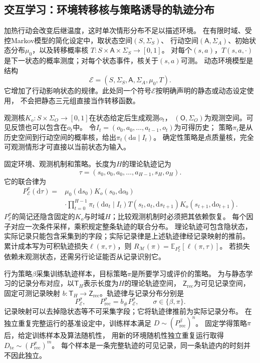 \subsection{交互学习：环境转移核与策略诱导的轨迹分布}
\label{sec:future-interactive-learning-process}

加热行动会改变后继温度，这时单次情形分布不足以描述环境。
在有限时域、受控Markov模型的简化设定中，取状态空间$(S,\Sigma_S)$、
行动空间$(\mathsf A,\Sigma_A)$、初始状态分布$\mu_0$，以及转移概率核
$T:S\times\mathsf A\times\Sigma_S\to[0,1]$。
对每个$(s,a)$，$T(s,a,\cdot)$是下一状态的概率测度；对每个状态事件，核关于$(s,a)$可测。
动态环境模型是结构
\[
  \mathcal E=(S,\Sigma_S,\mathsf A,\Sigma_A,\mu_0,T).
\]
它增加了行动影响状态的规律。此处同一个符号$\mathcal E$按明确声明的静态或动态设定使用，
不会把静态三元组直接当作转移函数。

观测核$K_o:S\times\Sigma_O\to[0,1]$在状态给定后生成观测$o_t$，
$(\mathsf O,\Sigma_O)$为观测空间。可见反馈也可以包含在$o_t$中。
令$I_t=(o_0,a_0,\ldots,a_{t-1},o_t)$为可得历史；
策略$\pi_t$是从历史空间到行动空间的概率核，给出$\pi_t(\mathrm da\mid I_t)$。
确定性策略是点质量核，完全可观测情形才可直接以当前状态为输入。

固定环境、观测机制和策略。长度为$H$的理论轨迹记为
\[
  \tau=(s_0,o_0,a_0,\ldots,a_{H-1},s_H,o_H).
\]
它的联合律为
\begin{equation}
  \begin{aligned}
    P_{\mathcal E}^{\pi}(\mathrm d\tau)
    ={}&\mu_0(\mathrm ds_0)K_o(s_0,\mathrm do_0)\\
      &\cdot\prod_{t=0}^{H-1}
      \pi_t(\mathrm da_t\mid I_t)
      T(s_t,a_t,\mathrm ds_{t+1})K_o(s_{t+1},\mathrm do_{t+1}).
  \end{aligned}
  \label{eq:future-interactive-trajectory-law}
\end{equation}
$P_{\mathcal E}^{\pi}$的简记还隐含固定的$K_o$与时域$H$；比较观测机制时必须把其依赖恢复。
每个因子对应一次条件采样，乘积规定整条轨迹的联合分布。
理论轨迹可包含隐状态，实际记录只能包含采集到的字段；实际记录律是上述轨迹律经记录映射的推前。
累计成本写为可积轨迹损失$\ell(\pi,\tau)$，则
$R_{\mathcal M}(\pi)=\mathbb E_{P_{\mathcal E}^{\pi}}[\ell(\pi,\tau)]$。
若损失依赖未观测状态，还需另行论证能否从记录识别它。

行为策略$\beta$采集训练轨迹样本，目标策略$\pi$是所要学习或评价的策略。
为与静态学习的记录分布对应，以$\mathsf T_H$表示长度为$H$的理论轨迹空间，
$\mathsf Z_{\mathrm{rec}}$为可见记录空间，固定可测记录映射
$b:\mathsf T_H\to\mathsf Z_{\mathrm{rec}}$。轨迹律与记录分布分别是
\[
  P_{\mathcal E}^{\sigma},\qquad
  P_{\mathrm{rec}}^{\sigma}=b_{\#}P_{\mathcal E}^{\sigma},
  \qquad \sigma\in\{\beta,\pi\}.
\]
记录映射可以去掉隐状态等不可采集字段；它将轨迹律推前为实际记录分布。
在独立重复完整运行的基准设定中，训练样本满足
$D\sim(P_{\mathrm{rec}}^{\beta})^n$。
固定学得策略$\pi$后，给定训练样本及算法随机性，
用新的环境随机性独立重复运行取得$D_{\mathrm{te}}\sim(P_{\mathrm{rec}}^{\pi})^m$。
每个样本是一条完整轨迹的可见记录，同一条轨迹内的时刻并不因此独立。

